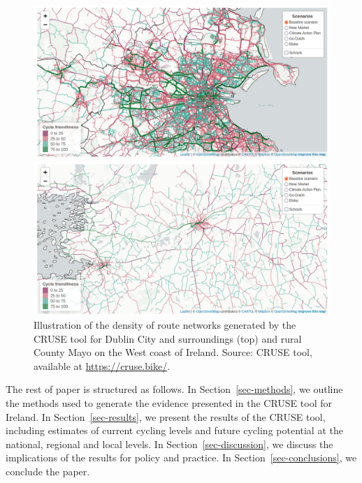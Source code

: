 \documentclass[
  super,
  preprint,
  3p]{elsarticle}
\begin{document}
\begin{figure}

{\centering 

\includegraphics{images/paste-1.png}

\includegraphics{images/paste-3.png}

}

\caption{\label{fig-dublin}Illustration of the density of route networks
generated by the CRUSE tool for Dublin City and surroundings (top) and
rural County Mayo on the West coast of Ireland. Source: CRUSE tool,
available at \url{https://cruse.bike/}.}

\end{figure}

The rest of paper is structured as follows. In
Section~\ref{sec-methods}, we outline the methods used to generate the
evidence presented in the CRUSE tool for Ireland. In
Section~\ref{sec-results}, we present the results of the CRUSE tool,
including estimates of current cycling levels and future cycling
potential at the national, regional and local levels. In
Section~\ref{sec-discussion}, we discuss the implications of the results
for policy and practice. In Section~\ref{sec-conclusions}, we conclude
the paper.
\end{document}
